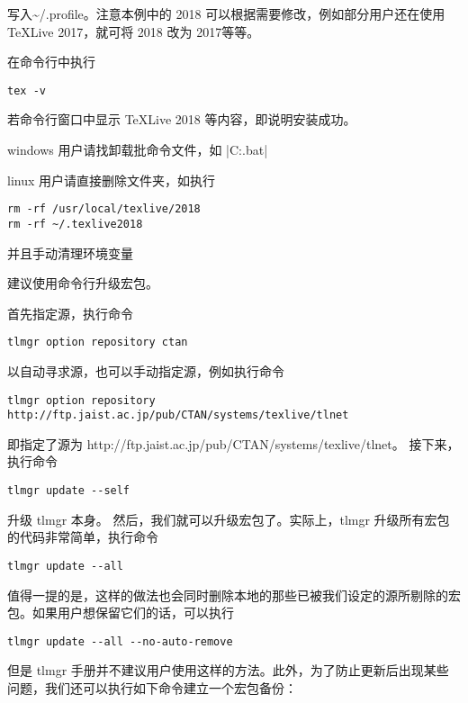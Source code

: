 写入\textasciitilde{}/.profile。注意本例中的 2018
可以根据需要修改，例如部分用户还在使用 TeXLive 2017，就可将 2018 改为
2017等等。



在命令行中执行
\begin{verbatim}
tex -v
\end{verbatim}
若命令行窗口中显示 TeXLive 2018 等内容，即说明安装成功。



windows 用户请找卸载批命令文件，如
|C:\texlive{}\tlpkg\installer\uninst.bat|

linux 用户请直接删除文件夹，如执行

\begin{verbatim}
rm -rf /usr/local/texlive/2018
rm -rf ~/.texlive2018
\end{verbatim}

并且手动清理环境变量



建议使用命令行升级宏包。

首先指定源，执行命令
\begin{verbatim}
tlmgr option repository ctan
\end{verbatim}
以自动寻求源，也可以手动指定源，例如执行命令
\begin{verbatim}
tlmgr option repository http://ftp.jaist.ac.jp/pub/CTAN/systems/texlive/tlnet
\end{verbatim}
即指定了源为 http://ftp.jaist.ac.jp/pub/CTAN/systems/texlive/tlnet。
接下来，执行命令
\begin{verbatim}
tlmgr update --self
\end{verbatim}

升级 tlmgr 本身。 然后，我们就可以升级宏包了。实际上，tlmgr
升级所有宏包的代码非常简单，执行命令
\begin{verbatim}
tlmgr update --all
\end{verbatim}

值得一提的是，这样的做法也会同时删除本地的那些已被我们设定的源所剔除的宏包。如果用户想保留它们的话，可以执行

\begin{verbatim}
tlmgr update --all --no-auto-remove
\end{verbatim}

但是 tlmgr
手册并不建议用户使用这样的方法。此外，为了防止更新后出现某些问题，我们还可以执行如下命令建立一个宏包备份：

